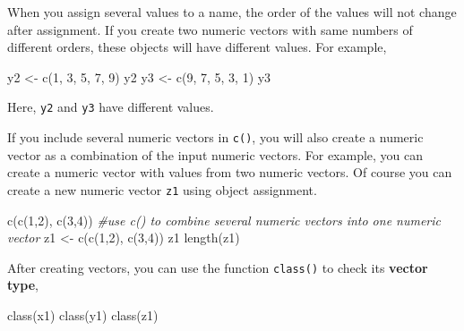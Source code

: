 \documentclass[
]{book}
\newenvironment{Shaded}{\begin{snugshade}}{\end{snugshade}}
\newcommand{\CommentTok}[1]{\textcolor[rgb]{0.56,0.35,0.01}{\textit{#1}}}
\newcommand{\DecValTok}[1]{\textcolor[rgb]{0.00,0.00,0.81}{#1}}
\newcommand{\FunctionTok}[1]{\textcolor[rgb]{0.00,0.00,0.00}{#1}}
\newcommand{\NormalTok}[1]{#1}
\newcommand{\OtherTok}[1]{\textcolor[rgb]{0.56,0.35,0.01}{#1}}
\newenvironment{infobox}[1]
  {
  \begin{itemize}
  \renewcommand{\labelitemi}{
    \raisebox{-.7\height}[0pt][0pt]{
      {\setkeys{Gin}{width=3em,keepaspectratio}
        \texttt{[image: pics/\#1]}}
    }
  }
  \setlength{\fboxsep}{1em}
  \begin{blackbox}
  \item
  }
  {
  \end{blackbox}
  \end{itemize}
  }
\newenvironment{blackbox}{
  \definecolor{shadecolor}{rgb}{0, 0, 0}  %
  \color{white}
  \begin{shaded}}
 {\end{shaded}}
\begin{document}
\begin{infobox}{caution}
When you assign several values to a name, the order of the values will not change after assignment. If you create two numeric vectors with same numbers of different orders, these objects will have different values. For example,

\begin{Shaded}
\begin{Highlighting}[]
\NormalTok{y2 }\OtherTok{\textless{}{-}} \FunctionTok{c}\NormalTok{(}\DecValTok{1}\NormalTok{, }\DecValTok{3}\NormalTok{, }\DecValTok{5}\NormalTok{, }\DecValTok{7}\NormalTok{, }\DecValTok{9}\NormalTok{)    }
\NormalTok{y2                        }
\NormalTok{y3 }\OtherTok{\textless{}{-}} \FunctionTok{c}\NormalTok{(}\DecValTok{9}\NormalTok{, }\DecValTok{7}\NormalTok{, }\DecValTok{5}\NormalTok{, }\DecValTok{3}\NormalTok{, }\DecValTok{1}\NormalTok{)    }
\NormalTok{y3}
\end{Highlighting}
\end{Shaded}

Here, \texttt{y2} and \texttt{y3} have different values.

\end{infobox}

If you include several numeric vectors in \texttt{c()}, you will also create a numeric vector as a combination of the input numeric vectors. For example, you can create a numeric vector with values from two numeric vectors. Of course you can create a new numeric vector \texttt{z1} using object assignment.

\begin{Shaded}
\begin{Highlighting}[]
\FunctionTok{c}\NormalTok{(}\FunctionTok{c}\NormalTok{(}\DecValTok{1}\NormalTok{,}\DecValTok{2}\NormalTok{), }\FunctionTok{c}\NormalTok{(}\DecValTok{3}\NormalTok{,}\DecValTok{4}\NormalTok{))          }\CommentTok{\#use c() to combine several numeric vectors into one numeric vector}
\NormalTok{z1 }\OtherTok{\textless{}{-}} \FunctionTok{c}\NormalTok{(}\FunctionTok{c}\NormalTok{(}\DecValTok{1}\NormalTok{,}\DecValTok{2}\NormalTok{), }\FunctionTok{c}\NormalTok{(}\DecValTok{3}\NormalTok{,}\DecValTok{4}\NormalTok{))}
\NormalTok{z1}
\FunctionTok{length}\NormalTok{(z1)}
\end{Highlighting}
\end{Shaded}

After creating vectors, you can use the function \texttt{class()} to check its \textbf{vector type},

\begin{Shaded}
\begin{Highlighting}[]
\FunctionTok{class}\NormalTok{(x1)}
\FunctionTok{class}\NormalTok{(y1) }
\FunctionTok{class}\NormalTok{(z1)}
\end{Highlighting}
\end{Shaded}
\end{document}

